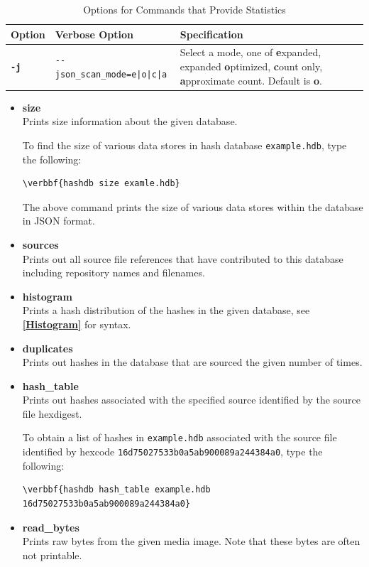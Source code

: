\documentclass[11pt,fleqn]{article} %
\begin{document}
\begin{table}[!ht]
\centering
\caption{Options for Commands that Provide Statistics}
\label{tab:StatisticsOptions}
\begin{tabular}{|p{1.5 cm}|p{8 cm}|p{4 cm}|}
\hline \hline
\textbf{Option} & \textbf{Verbose Option} & \textbf{Specification} \\
\hline
\textbf{\texttt{-j}} & \verb+--json_scan_mode=e|o|c|a+ & Select a mode, one of \textbf{e}xpanded, expanded \textbf{o}ptimized, \textbf{c}ount only, \textbf{a}pproximate count. Default is \textbf{o}.\\
\hline
\end{tabular}
\end{table}

\begin{itemize}
\item \textbf{size}\\
Prints size information about the given database.

To find the size of various data stores in hash database \texttt{example.hdb},
type the following:
\begin{Verbatim}[commandchars=\\\{\}]
\verbbf{hashdb size examle.hdb}
\end{Verbatim}
The above command prints the size of various data stores within the database in JSON format.\\

\item \textbf{sources}\\
Prints out all source file references that have contributed to this database including repository names and filenames.
\item \textbf{histogram}\\
Prints a hash distribution of the hashes in the given database, see \textbf{\autoref{Histogram}} for syntax.
\item \textbf{duplicates}\\
Prints out hashes in the database that are sourced the given number of times.
\item \textbf{hash\_table}\\
Prints out hashes associated with the specified source identified by the source file hexdigest.

To obtain a list of hashes in \texttt{example.hdb} associated with the source file identified by hexcode \texttt{16d75027533b0a5ab900089a244384a0}, type the following:
\begin{Verbatim}[commandchars=\\\{\}]
\verbbf{hashdb hash_table example.hdb 16d75027533b0a5ab900089a244384a0}
\end{Verbatim}

\item \textbf{read\_bytes}\\
Prints raw bytes from the given media image. Note that these bytes are often not printable.
\end{itemize}
\end{document}
